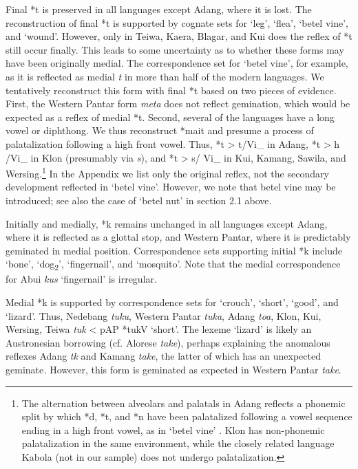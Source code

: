 Final *t is preserved in all languages except Adang, where it is lost. The reconstruction of final *t is supported by cognate sets for `leg', `flea', `betel vine', and `wound'. However, only in Teiwa, Kaera, Blagar, and Kui does the reflex of *t still occur finally. This leads to some uncertainty as to whether these forms may have been originally medial. The correspondence set for `betel vine', for example, as it is reflected as medial \textit{t} in more than half of the modern languages. We tentatively reconstruct this form with final *t based on two pieces of evidence. First, the Western Pantar form \textit{meta} does not reflect gemination, which would be expected as a reflex of medial *t. Second, several of the languages have a long vowel or diphthong. We thus reconstruct *mait and presume a process of palatalization following a high front vowel. Thus, *t {\textgreater} t{\textesh}/Vi\_ in Adang, *t {\textgreater} h /Vi\_ in Klon (presumably via \textit{s}), and *t {\textgreater} s/ Vi\_ in Kui, Kamang, 
Sawila, and Wersing.\footnote{ The alternation between alveolars and palatals in Adang reflects a phonemic split by which *d, *t, and *n have been palatalized following a vowel sequence ending in a high front vowel, as in `betel vine' \citep{RobinsonEtAltaadang}. Klon has non-phonemic palatalization in the same environment, while the closely related language Kabola (not in our sample) does not undergo palatalization.} In the Appendix we list only the original reflex, not the secondary development reflected in `betel vine'. However, we note that betel vine may be introduced; see also the case of `betel nut' in section 2.1 above. 

Initially and medially, *k remains unchanged in all languages except Adang, where it is reflected as a glottal stop, and Western Pantar, where it is predictably geminated in medial position. Correspondence sets supporting initial *k include `bone', `dog\textsubscript{2}', `fingernail', and `mosquito'. Note that the medial correspondence for Abui \textit{kus{\textsci}{\ng}} `fingernail' is irregular. 

Medial *k is supported by correspondence sets for `crouch', `short', `good', and `lizard'. Thus, Nedebang \textit{tuku}, Western Pantar \textit{tuk{\textlengthmark}a}, Adang \textit{to{\textglotstop}a{\ng}}, Klon, Kui, Wersing, Teiwa \textit{tuk }{\textless} pAP *tukV `short'. The lexeme `lizard' is likely an Austronesian borrowing (cf. Alorese \textit{take}), perhaps explaining the anomalous reflexes Adang \textit{t{\textepsilon}k{\textopeno}} and Kamang \textit{tak{\textlengthmark}e{\textlengthmark}}, the latter of which has an unexpected geminate\textit{. }However, this form is geminated as expected in Western Pantar \textit{tak{\textlengthmark}e}.

